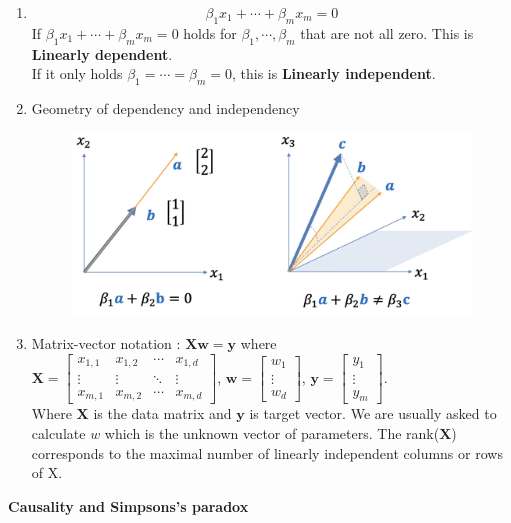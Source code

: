 \documentclass{article}
\newcommand{\matr}[1]{\mathbf{#1}}
\begin{document}
\begin{enumerate}
    \item \[\beta_1 x_1+\cdots+\beta_m x_m = 0\] 
    If \(\beta_1 x_1+\cdots+\beta_m x_m = 0\) holds for $\beta_1 ,\cdots,\beta_m$ that are not all zero. This is \textbf{Linearly dependent}.\\
    If it only holds \(\beta_1 = \cdots = \beta_m = 0\), this is \textbf{Linearly independent}.
    \item Geometry of dependency and independency
    \begin{figure}[h]
        \centering
        \includegraphics[width=0.70\linewidth]{image/gerolieanr.png}
    \end{figure}
    \item Matrix-vector notation : $\displaystyle \matr{Xw} = \matr{y}$ where \\
    $\matr{X} = \begin{bmatrix}
    x_{1,1} & x_{1,2} & \cdots & x_{1,d} \\
    \vdots & \vdots & \ddots & \vdots \\
    x_{m,1} & x_{m,2} & \cdots & x_{m,d}
    \end{bmatrix}$, $\matr{w} = \begin{bmatrix}
        w_1\\ \vdots \\ w_d
    \end{bmatrix}$, $\matr{y} = \begin{bmatrix}
        y_1\\ \vdots \\ y_m
    \end{bmatrix}$. \\
    Where $\matr{X}$ is the data matrix and $\matr{y}$ is target vector. We are usually asked to calculate $w$ which is the unknown vector of parameters. The rank($\matr{X}$) corresponds to the maximal number of linearly independent columns or rows of X.
\end{enumerate}
\textbf{Causality and Simpsons's paradox}
\end{document}
